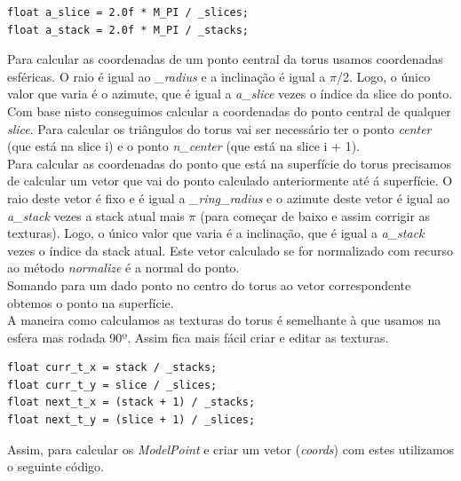 \documentclass[a4paper]{report}
\begin{document}
\begin{lstlisting}
float a_slice = 2.0f * M_PI / _slices;
float a_stack = 2.0f * M_PI / _stacks;
\end{lstlisting}
Para calcular as coordenadas de um ponto central da torus usamos coordenadas
esféricas. O raio é igual ao \textit{\_radius} e a inclinação é igual a $\pi$/2.
Logo, o único valor que varia é o azimute, que é igual a \textit{a\_slice} vezes
o índice da slice do ponto.\\
Com base nisto conseguimos calcular a coordenadas do ponto central de qualquer
\textit{slice}. Para calcular os triângulos do torus vai ser necessário ter o
ponto \textit{center} (que está na slice i) e o ponto \textit{n\_center} (que
está na slice i + 1).\\
Para calcular as coordenadas do ponto que está na superfície do torus precisamos
de calcular um vetor que vai do ponto calculado anteriormente até á
superfície. O raio deste vetor é fixo e é igual a \textit{\_ring\_radius} e o
azimute deste vetor é igual ao \textit{a\_stack} vezes a stack atual mais $\pi$
(para começar de baixo e assim corrigir as texturas). Logo, o único valor que
varia é a inclinação, que é igual a \textit{a\_stack} vezes o índice da stack
atual. Este vetor calculado se for normalizado com recurso ao método
\textit{normalize} é a normal do ponto.\\
Somando para um dado ponto no centro do torus ao vetor correspondente obtemos o
ponto na superfície.\\
A maneira como calculamos as texturas do torus é semelhante à que usamos na
esfera  mas rodada 90º. Assim fica mais fácil criar e editar as texturas.\\
\begin{lstlisting}
float curr_t_x = stack / _stacks;
float curr_t_y = slice / _slices;
float next_t_x = (stack + 1) / _stacks;
float next_t_y = (slice + 1) / _slices;
\end{lstlisting}
Assim, para calcular os \textit{ModelPoint} e criar um vetor (\textit{coords})
com estes utilizamos o seguinte código.


\end{document}
